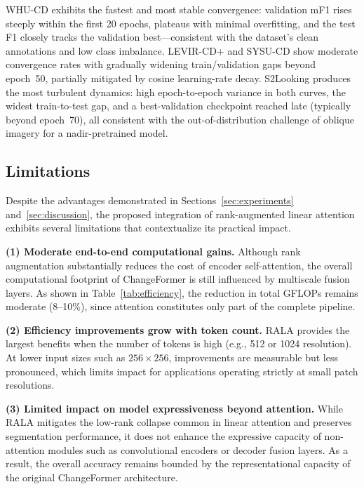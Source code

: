 \documentclass[runningheads]{llncs}
\newcommand{\journal}[1]{{\color{orange}#1}}
\begin{document}
\journal{%
WHU-CD exhibits the fastest and most stable convergence: validation mF1 rises
steeply within the first 20 epochs, plateaus with minimal overfitting, and the
test F1 closely tracks the validation best—consistent with the dataset's clean
annotations and low class imbalance.
LEVIR-CD+ and SYSU-CD show moderate convergence rates with gradually widening
train/validation gaps beyond epoch~50, partially mitigated by cosine
learning-rate decay.
S2Looking produces the most turbulent dynamics: high epoch-to-epoch variance in
both curves, the widest train-to-test gap, and a best-validation checkpoint
reached late (typically beyond epoch~70), all consistent with the
out-of-distribution challenge of oblique imagery for a nadir-pretrained model.%
}

\subsection{Limitations}
\label{subsec:limitations}

Despite the advantages demonstrated in Sections~\ref{sec:experiments}
and~\ref{sec:discussion}, the proposed integration of rank-augmented linear
attention exhibits several limitations that contextualize its practical impact.

\noindent \textbf{(1) Moderate end-to-end computational gains.} Although rank
augmentation substantially reduces the cost of encoder self-attention, the
overall computational footprint of ChangeFormer is still influenced by
multiscale fusion layers. As shown in Table~\ref{tab:efficiency}, the reduction
in total GFLOPs remains moderate (8--10\%), since attention constitutes only
part of the complete pipeline.


\noindent \textbf{(2) Efficiency improvements grow with token count.} RALA
provides the largest benefits when the number of tokens is high (e.g., 512 or
1024 resolution). At lower input sizes such as $256\times256$, improvements are
measurable but less pronounced, which limits impact for applications operating
strictly at small patch resolutions.

\noindent \textbf{(3) Limited impact on model expressiveness beyond attention.}
While RALA mitigates the low-rank collapse common in linear attention and
preserves segmentation performance, it does not enhance the expressive capacity
of non-attention modules such as convolutional encoders or decoder fusion
layers. As a result, the overall accuracy remains bounded by the
representational capacity of the original ChangeFormer architecture.
\end{document}
